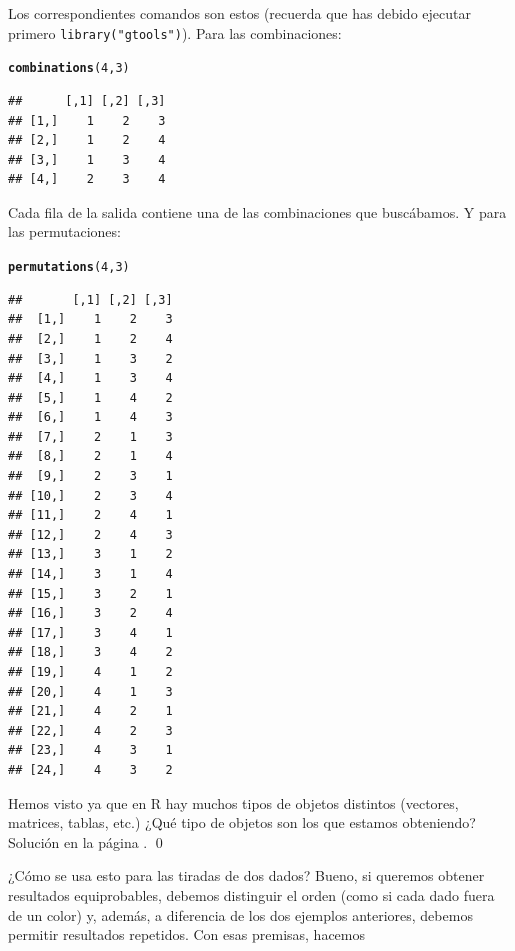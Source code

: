 \documentclass[10pt,a4paper]{article}\usepackage[]{graphicx}\usepackage[]{color}
\makeatletter
\newcommand{\hlnum}[1]{\textcolor[rgb]{0.686,0.059,0.569}{#1}}%
\newcommand{\hlstd}[1]{\textcolor[rgb]{0.345,0.345,0.345}{#1}}%
\newcommand{\hlkwd}[1]{\textcolor[rgb]{0.737,0.353,0.396}{\textbf{#1}}}%
\newenvironment{kframe}{%
 \def\at@end@of@kframe{}%
 \ifinner\ifhmode%
  \def\at@end@of@kframe{\end{minipage}}%
  \begin{minipage}{\columnwidth}%
 \fi\fi%
 \def\FrameCommand##1{\hskip\@totalleftmargin \hskip-\fboxsep
 \colorbox{shadecolor}{##1}\hskip-\fboxsep
     \hskip-\linewidth \hskip-\@totalleftmargin \hskip\columnwidth}%
 \MakeFramed {\advance\hsize-\width
   \@totalleftmargin\z@ \linewidth\hsize
   \@setminipage}}%
 {\par\unskip\endMakeFramed%
 \at@end@of@kframe}
\newenvironment{knitrout}{}{} %
\newcounter {cont01}
\makeatother
\begin{document}
Los correspondientes comandos son estos (recuerda que has debido ejecutar primero {\tt library("gtools")}). Para las combinaciones:
\begin{knitrout}
\color{fgcolor}\begin{kframe}
\begin{alltt}
   \hlkwd{combinations}\hlstd{(}\hlnum{4}\hlstd{,}\hlnum{3}\hlstd{)}
\end{alltt}
\begin{verbatim}
##      [,1] [,2] [,3]
## [1,]    1    2    3
## [2,]    1    2    4
## [3,]    1    3    4
## [4,]    2    3    4
\end{verbatim}
\end{kframe}
\end{knitrout}
Cada fila de la salida contiene una de las combinaciones que buscábamos. Y para las permutaciones:
\begin{knitrout}
\color{fgcolor}\begin{kframe}
\begin{alltt}
   \hlkwd{permutations}\hlstd{(}\hlnum{4}\hlstd{,}\hlnum{3}\hlstd{)}
\end{alltt}
\begin{verbatim}
##       [,1] [,2] [,3]
##  [1,]    1    2    3
##  [2,]    1    2    4
##  [3,]    1    3    2
##  [4,]    1    3    4
##  [5,]    1    4    2
##  [6,]    1    4    3
##  [7,]    2    1    3
##  [8,]    2    1    4
##  [9,]    2    3    1
## [10,]    2    3    4
## [11,]    2    4    1
## [12,]    2    4    3
## [13,]    3    1    2
## [14,]    3    1    4
## [15,]    3    2    1
## [16,]    3    2    4
## [17,]    3    4    1
## [18,]    3    4    2
## [19,]    4    1    2
## [20,]    4    1    3
## [21,]    4    2    1
## [22,]    4    2    3
## [23,]    4    3    1
## [24,]    4    3    2
\end{verbatim}
\end{kframe}
\end{knitrout}
\begin{ejercicio}
\label{tut03:ejercicio13}
\quad
Hemos visto ya que en R hay muchos tipos de objetos distintos (vectores, matrices, tablas, etc.) ¿Qué tipo de objetos son los que estamos obteniendo? Solución en la página \pageref{tut03:ejercicio13:sol}.
\qed
\end{ejercicio}
¿Cómo se usa esto para las tiradas de dos dados? Bueno, si queremos obtener resultados equiprobables, debemos distinguir el orden (como si cada dado fuera de un color) y, además, a diferencia de los dos ejemplos anteriores, debemos permitir resultados repetidos. Con esas premisas, hacemos
\end{document}
